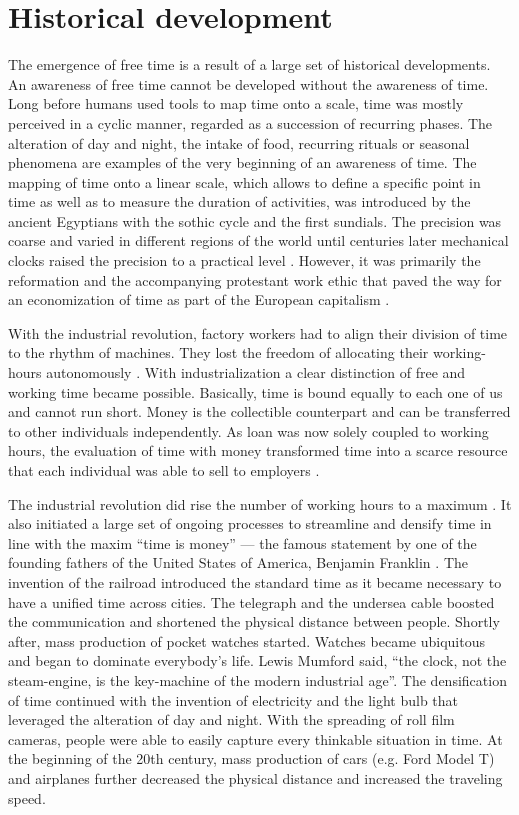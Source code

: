 \documentclass[12pt,numbers=noenddot,parskip,bibliography=totocnumbered,listof=totocnumbered,draft]{scrreprt}
\begin{document}
\section{Historical development}
The emergence of free time is a result of a large set of historical developments. An awareness of free time cannot be developed without the awareness of time. Long before humans used tools to map time onto a scale, time was mostly perceived in a cyclic manner, regarded as a succession of recurring phases. The alteration of day and night, the intake of food, recurring rituals or seasonal phenomena are examples of the very beginning of an awareness of time. The mapping of time onto a linear scale, which allows to define a specific point in time as well as to measure the duration of activities, was introduced by the ancient Egyptians with the sothic cycle and the first sundials. \citep[p.25-27]{whitrow1989} The precision was coarse and varied in different regions of the world until centuries later mechanical clocks raised the precision to a practical level \citep[p.103]{whitrow1989}. However, it was primarily the reformation and the accompanying protestant work ethic that paved the way for an economization of time as part of the European capitalism \citep[p.22]{weber2006}.

With the industrial revolution, factory workers had to align their division of time to the rhythm of machines. They lost the freedom of allocating their working-hours autonomously \citep[p.160]{whitrow1989}. With industrialization a clear distinction of free and working time became possible. Basically, time is bound equally to each one of us and cannot run short. Money is the collectible counterpart and can be transferred to other individuals independently. As loan was now solely coupled to working hours, the evaluation of time with money transformed time into a scarce resource that each individual was able to sell to employers \citep[p.54]{marx1867}.

The industrial revolution did rise the number of working hours to a maximum \citep[p.98]{prahl2002}. It also initiated a large set of ongoing processes to streamline and densify time in line with the maxim ``time is money'' — the famous statement by one of the founding fathers of the United States of America, Benjamin Franklin \citep[p.22]{weber2006}. The invention of the railroad introduced the standard time as it became necessary to have a unified time across cities. The telegraph and the undersea cable boosted the communication and shortened the physical distance between people. Shortly after, mass production of pocket watches started. Watches became ubiquitous and began to dominate everybody's life. Lewis Mumford said, ``the clock, not the steam-engine, is the key-machine of the modern industrial age''. \citep[p.161]{whitrow1989} The densification of time continued with the invention of electricity and the light bulb that leveraged the alteration of day and night. With the spreading of roll film cameras, people were able to easily capture every thinkable situation in time. At the beginning of the 20th century, mass production of cars (e.g. Ford Model T) and airplanes further decreased the physical distance and increased the traveling speed.
\end{document}
